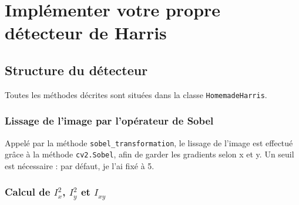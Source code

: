 \documentclass{article}
\begin{document}

\newpage

\section{Implémenter votre propre détecteur de Harris}

\subsection{Structure du détecteur}

    Toutes les méthodes décrites sont situées dans la classe \verb+HomemadeHarris+.

    \subsubsection{Lissage de l'image par l'opérateur de Sobel}
    
        Appelé par la méthode \verb+sobel_transformation+, le lissage de l'image est effectué grâce à la méthode \verb+cv2.Sobel+, afin de garder les gradients selon x et y. Un seuil est nécessaire : par défaut, je l'ai fixé à 5.

    \subsubsection{Calcul de $I_{x}^{2}$, $I_{y}^{2}$ et $I_{xy}$}
    
\end{document}
